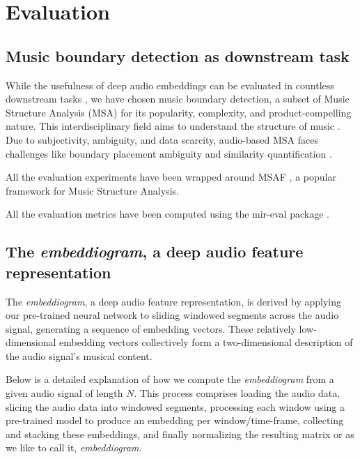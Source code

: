 \chapter{Evaluation}

\section{Music boundary detection as downstream task}

While the usefulness of deep audio embeddings can be evaluated in countless downstream tasks \cite{Li2023MERT:Training, Kim2020OneStrategies}, we have chosen music boundary detection, a subset of Music Structure Analysis (MSA) for its popularity, complexity, and product-compelling nature. This interdisciplinary field aims to understand the structure of music \cite{Nieto2020Audio-BasedApplications}. Due to subjectivity, ambiguity, and data scarcity, audio-based MSA faces challenges like boundary placement ambiguity and similarity quantification \cite{NietoPerceptualMusic}.  

All the evaluation experiments have been wrapped around MSAF \cite{NietoMSAF:FRAMEWORK}, a popular framework for Music Structure Analysis.

All the evaluation metrics have been computed using the mir-eval package \cite{RaffelMir_eval:METRICS}.

\section{The \textit{embeddiogram}, a deep audio feature representation}

The \textit{embeddiogram}, a deep audio feature representation, is derived by applying our pre-trained neural network to sliding windowed segments across the audio signal, generating a sequence of embedding vectors. These relatively low-dimensional embedding vectors collectively form a two-dimensional description of the audio signal's musical content.

Below is a detailed explanation of how we compute the \textit{embeddiogram} from a given audio signal of length $N$. This process comprises loading the audio data, slicing the audio data into windowed segments, processing each window using a pre-trained model to produce an embedding per window/time-frame, collecting and stacking these embeddings, and finally normalizing the resulting matrix or as we like to call it, \textit{embeddiogram}. 

